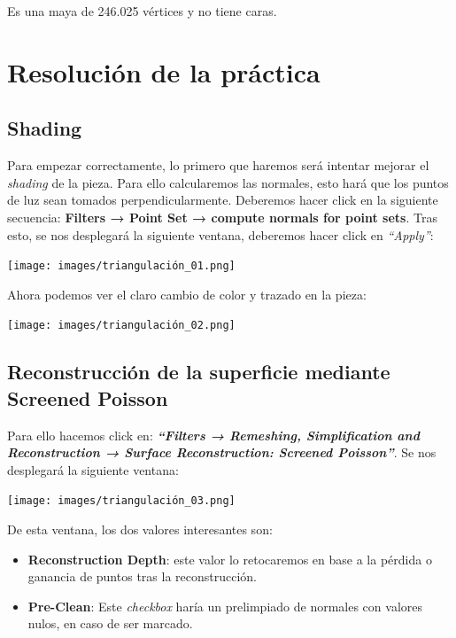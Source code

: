 \documentclass[options]{article}
\begin{document}
Es una maya de 246.025 vértices y no tiene caras.
\pagebreak

\section{Resolución de la práctica}
\subsection{Shading}

Para empezar correctamente, lo primero que haremos será intentar mejorar el \textit{shading} de la pieza. Para ello calcularemos las normales, esto hará que los puntos de luz sean tomados perpendicularmente. Deberemos hacer click en la siguiente secuencia: \textbf{Filters → Point Set → compute normals for point sets}. Tras esto, se nos desplegará la siguiente ventana, deberemos hacer click en \textit{``Apply''}:

\begin{center}
    \texttt{[image: images/triangulación\_01.png]}    
\end{center}

Ahora podemos ver el claro cambio de color y trazado en la pieza:
\begin{center}
    \texttt{[image: images/triangulación\_02.png]}    
\end{center}
\subsection{Reconstrucción de la superficie mediante Screened Poisson}

Para ello hacemos click en: \textbf{\textit{``Filters → Remeshing, Simplification and Reconstruction → Surface Reconstruction: Screened Poisson''}}. Se nos desplegará la siguiente ventana:

\begin{center}
    \texttt{[image: images/triangulación\_03.png]}    
\end{center}

De esta ventana, los dos valores interesantes son:
\begin{itemize}
    \item \textbf{Reconstruction Depth}: este valor lo retocaremos en base a la pérdida o ganancia de puntos tras la reconstrucción.
    \item \textbf{Pre-Clean}: Este \textit{checkbox} haría un prelimpiado de normales con valores nulos, en caso de ser marcado.
\end{itemize}
\end{document}
